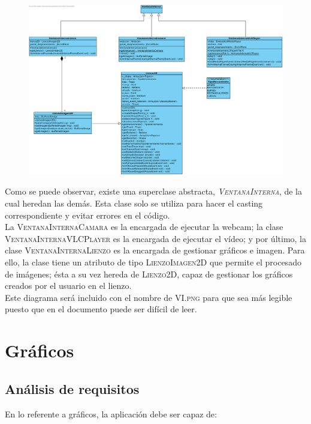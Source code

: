 \documentclass[11pt,a4paper]{article}
\begin{document}
\begin{figure}[H]
\centering
	\includegraphics[scale=0.45]{./UML/vi.png}
\end{figure}

Como se puede observar, existe una superclase abstracta, \textsc{\textit{VentanaInterna}}, de la cual heredan las demás. Esta clase solo se utiliza para hacer el casting correspondiente y evitar errores en el código.\\ 

La \textsc{VentanaInternaCamara} es la encargada de ejecutar la webcam; la clase \textsc{VentanaInternaVLCPlayer} es la encargada de ejecutar el vídeo; y por último, la clase \textsc{VentanaInternaLienzo} es la encargada de gestionar gráficos e imagen. Para ello, la clase tiene un atributo de tipo \textsc{LienzoImagen2D} que permite el procesado de imágenes; ésta a su vez hereda de \textsc{Lienzo2D}, capaz de gestionar los gráficos creados por el usuario en el lienzo.\\

Este diagrama será incluido con el nombre de \textsc{VI.png} para que sea más legible puesto que en el documento puede ser difícil de leer.

\newpage

\section{Gráficos}

\subsection{Análisis de requisitos}
En lo referente a gráficos, la aplicación debe ser capaz de:
\end{document}
